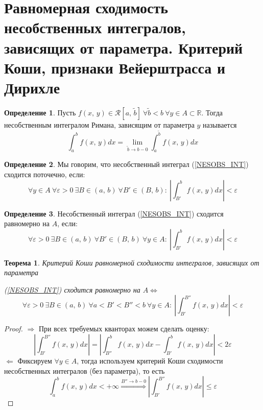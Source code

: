 \documentclass[a4paper,12pt]{article}
\renewcommand{\leq}{\ensuremath{\leqslant}}
\theoremstyle{plain}
\newtheorem{theorem}{Теорема}[section]
\theoremstyle{definition}
\newtheorem{definition}{Определение}[section]
\theoremstyle{remark}
\begin{document}
\section{Равномерная сходимость несобственных интегралов, зависящих от параметра. Критерий Коши, признаки Вейерштрасса и Дирихле}
\begin{definition}
	Пусть $f(x,\,y) \in \mathcal{R}[a,\,\tilde{b}] \: \forall \tilde{b} < b \: \forall y \in A \subset \mathbb{R}$. Тогда несобственным интегралом Римана, зависящим от параметра $y$ называется
	\begin{equation} \label{NESOBS_INT}
		\int_a^b f(x,\,y)dx = \lim_{\tilde{b} \to b - 0} \int_a^{\tilde{b}}f(x,\,y)dx
	\end{equation}
\end{definition}

\begin{definition}
	Мы говорим, что несобственный интеграл (\ref{NESOBS_INT}) сходится поточечно, если:
	\[\forall y \in A \: \forall \varepsilon > 0 \: \exists B \in (a,\,b) \: \forall B' \in (B,\,b):\: \left|\int_{B'}^b f(x,\,y)dx\right| < \varepsilon\]
\end{definition}

\begin{definition}
	Несобственный интеграл (\ref{NESOBS_INT}) сходится равномерно на $A$, если:
	\[\forall \varepsilon > 0 \: \exists B \in (a,\,b) \: \forall B' \in (B,\,b) \: \forall y \in A :\: \left|\int_{B'}^b f(x,\,y)dx\right| < \varepsilon\]
\end{definition}

\begin{theorem}
	Критерий Коши равномерной сходимости интегралов, зависящих от параметра

	(\ref{NESOBS_INT}) сходится равномерно на $A \Leftrightarrow$
	\[\forall \varepsilon > 0 \: \exists B \in (a,\,b) \: \forall a < B' < B''< b \: \forall y \in A :\: \left|\int_{B'}^{B''}f(x,\,y)dx\right| < \varepsilon\] 
\end{theorem}

\begin{proof}
	$\Rightarrow$ При всех требуемых кванторах можем сделать оценку:
	\[\left|\int_{B'}^{B''}f(x,\,y)dx\right| = \left|\int_{B''}^b f(x,\,y)dx - \int_{B'}^bf(x,\,y)dx\right| < 2\varepsilon\]
	$\Leftarrow$ Фиксируем $\forall y \in A$, тогда используем критерий Коши сходимости несобственных интегралов (без параметра), то есть
	\[\int_a^b f(x,\,y)dx < +\infty \stackrel{B'' \to b - 0}{\Rightarrow} \left|\int_{B'}^{B''}f(x,\,y)dx\right| \leq \varepsilon\]
\end{proof}
\end{document}
